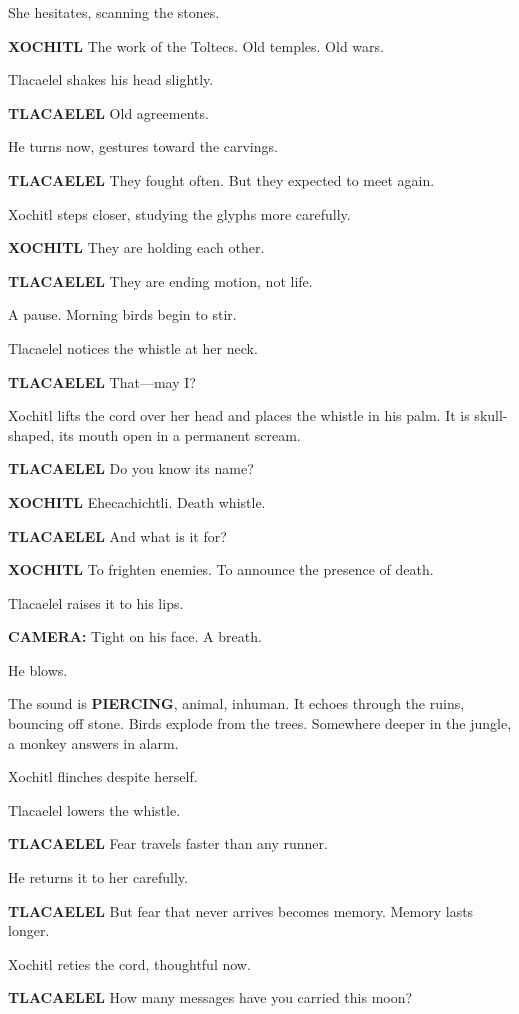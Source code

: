\documentclass[12pt]{article}
\begin{document}
She hesitates, scanning the stones.

\textbf{XOCHITL}  
The work of the Toltecs.  
Old temples. Old wars.

Tlacaelel shakes his head slightly.

\textbf{TLACAELEL}  
Old agreements.

He turns now, gestures toward the carvings.

\textbf{TLACAELEL}  
They fought often.  
But they expected to meet again.

Xochitl steps closer, studying the glyphs more carefully.

\textbf{XOCHITL}  
They are holding each other.

\textbf{TLACAELEL}  
They are ending motion, not life.

A pause. Morning birds begin to stir.

Tlacaelel notices the whistle at her neck.

\textbf{TLACAELEL}  
That—may I?

Xochitl lifts the cord over her head and places the whistle in his palm. It is skull-shaped, its mouth open in a permanent scream.

\textbf{TLACAELEL}  
Do you know its name?

\textbf{XOCHITL}  
Ehecachichtli.  
Death whistle.

\textbf{TLACAELEL}  
And what is it for?

\textbf{XOCHITL}  
To frighten enemies.  
To announce the presence of death.

Tlacaelel raises it to his lips.

\textbf{CAMERA:} Tight on his face. A breath.

He blows.

The sound is \textbf{PIERCING}, animal, inhuman. It echoes through the ruins, bouncing off stone. Birds explode from the trees. Somewhere deeper in the jungle, a monkey answers in alarm.

Xochitl flinches despite herself.

Tlacaelel lowers the whistle.

\textbf{TLACAELEL}  
Fear travels faster than any runner.

He returns it to her carefully.

\textbf{TLACAELEL}  
But fear that never arrives becomes memory.  
Memory lasts longer.

Xochitl reties the cord, thoughtful now.

\textbf{TLACAELEL}  
How many messages have you carried this moon?
\end{document}
